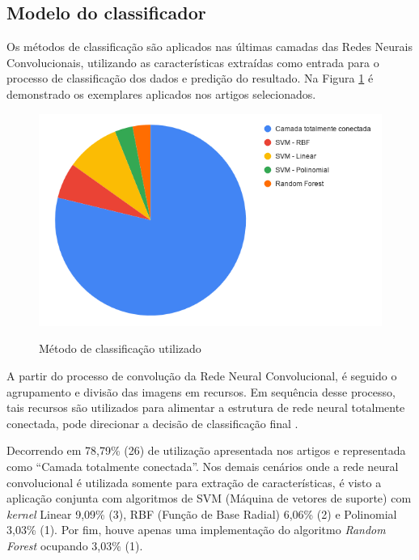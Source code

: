 \documentclass[
	12pt,				%
	oneside,			%
	a4paper,			%
	english,			%
	brazil				%
	]{abntex2ppgsi}
\begin{document}
\subsection{Modelo do classificador}
Os métodos de classificação são aplicados nas últimas camadas das Redes Neurais Convolucionais, utilizando as características extraídas como entrada para o processo de classificação dos dados e predição do resultado. Na Figura \ref{fig:grafico_classificador_vs_uso} é demonstrado os exemplares aplicados nos artigos selecionados.

\begin{figure}[H]
    \centering
    \caption{Método de classificação utilizado}
    \includegraphics[scale=.60]{imagens/revisao_sistematica/grafico_classificador_vs_uso.png}
    \label{fig:grafico_classificador_vs_uso}
\end{figure}


A partir do processo de convolução da Rede Neural Convolucional, é seguido o agrupamento e divisão das imagens em recursos. Em sequência desse processo, tais recursos são utilizados para alimentar a estrutura de rede neural totalmente conectada, pode direcionar a decisão de classificação final \cite{rauf2019visual}. 

Decorrendo em 78,79\% (26) de utilização apresentada nos artigos e representada como ``Camada totalmente conectada''. Nos demais cenários onde a rede neural convolucional é utilizada somente para extração de características, é visto a aplicação conjunta com algoritmos de SVM (Máquina de vetores de suporte) com \textit{kernel} Linear 9,09\% (3), RBF (Função de Base Radial) 6,06\% (2) e Polinomial 3,03\% (1). Por fim, houve apenas uma implementação do algoritmo \textit{Random Forest} ocupando 3,03\% (1).
\end{document}
